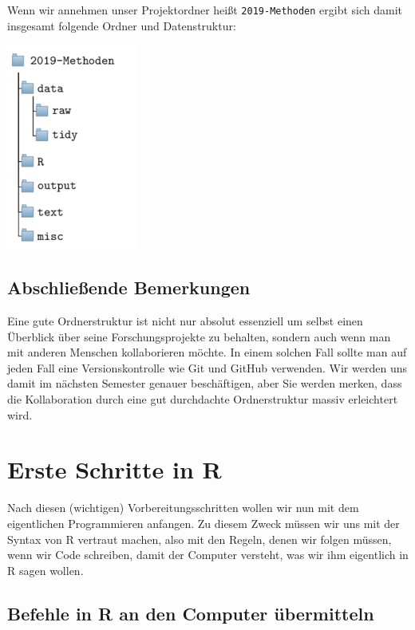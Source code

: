 \documentclass[]{tufte-book}
\begin{document}
Wenn wir annehmen unser Projektordner heißt \texttt{2019-Methoden}
ergibt sich damit insgesamt folgende Ordner und Datenstruktur:

\begin{center}\includegraphics{figures/wd-structure} \end{center}

\section{Abschließende Bemerkungen}\label{abschlieende-bemerkungen}

Eine gute Ordnerstruktur ist nicht nur absolut essenziell um selbst
einen Überblick über seine Forschungsprojekte zu behalten, sondern auch
wenn man mit anderen Menschen kollaborieren möchte. In einem solchen
Fall sollte man auf jeden Fall eine Versionskontrolle wie Git und GitHub
verwenden. Wir werden uns damit im nächsten Semester genauer
beschäftigen, aber Sie werden merken, dass die Kollaboration durch eine
gut durchdachte Ordnerstruktur massiv erleichtert wird.

\chapter{Erste Schritte in R}\label{basics}

Nach diesen (wichtigen) Vorbereitungsschritten wollen wir nun mit dem
eigentlichen Programmieren anfangen. Zu diesem Zweck müssen wir uns mit
der Syntax von R vertraut machen, also mit den Regeln, denen wir folgen
müssen, wenn wir Code schreiben, damit der Computer versteht, was wir
ihm eigentlich in R sagen wollen.

\section{Befehle in R an den Computer
übermitteln}\label{befehle-in-r-an-den-computer-ubermitteln}
\end{document}
